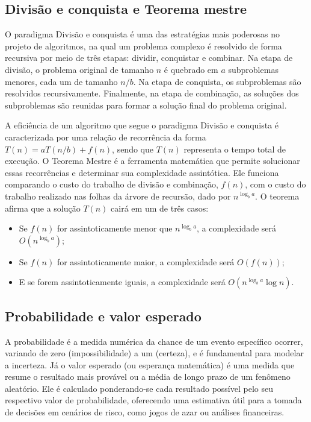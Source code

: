 \subsection{Divisão e conquista e Teorema mestre}
O paradigma Divisão e conquista é uma das estratégias mais poderosas no projeto de algoritmos, na qual um problema complexo é resolvido de forma recursiva por meio de três etapas: dividir, conquistar e combinar. Na etapa de divisão, o problema original de tamanho $n$ é quebrado em $a$ subproblemas menores, cada um de tamanho $n/b$. Na etapa de conquista, os subproblemas são resolvidos recursivamente. Finalmente, na etapa de combinação, as soluções dos subproblemas são reunidas para formar a solução final do problema original.

A eficiência de um algoritmo que segue o paradigma Divisão e conquista é caracterizada por uma relação de recorrência da forma $T(n) = aT(n/b) + f(n)$, sendo que $T(n)$ representa o tempo total de execução. O Teorema Mestre é a ferramenta matemática que permite solucionar essas recorrências e determinar sua complexidade assintótica. Ele funciona comparando o custo do trabalho de divisão e combinação, $f(n)$, com o custo do trabalho realizado nas folhas da árvore de recursão, dado por $n^{\log_b a}$. O teorema afirma que a solução $T(n)$ cairá em um de três casos:
\begin{itemize}
    \item Se $f(n)$ for assintoticamente menor que $n^{\log_b a}$, a complexidade será $O(n^{\log_b a})$;
    \item Se $f(n)$ for assintoticamente maior, a complexidade será $O(f(n))$;
    \item E se forem assintoticamente iguais, a complexidade será $O(n^{\log_b a} \log n)$.
\end{itemize}  

\subsection{Probabilidade e valor esperado}
A probabilidade é a medida numérica da chance de um evento específico ocorrer, variando de zero (impossibilidade) a um (certeza), e é fundamental para modelar a incerteza. Já o valor esperado (ou esperança matemática) é uma medida que resume o resultado mais provável ou a média de longo prazo de um fenômeno aleatório. Ele é calculado ponderando-se cada resultado possível pelo seu respectivo valor de probabilidade, oferecendo uma estimativa útil para a tomada de decisões em cenários de risco, como jogos de azar ou análises financeiras.

